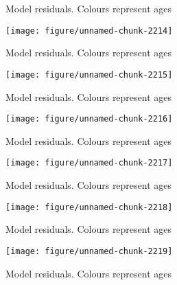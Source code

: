 \documentclass[a4paper]{article}\usepackage{graphicx, color}
\makeatletter
\def\maxwidth{ %
  \ifdim\Gin@nat@width>\linewidth
    \linewidth
  \else
    \Gin@nat@width
  \fi
}
\newenvironment{knitrout}{}{} %
\makeatother
\begin{document}
\begin{knitrout}
\begin{figure}[H]
\caption[Model residuals]{Model residuals. Colours represent ages\label{fig:unnamed-chunk-2213}}
\end{figure}
\begin{figure}[H]


{\centering \texttt{[image: figure/unnamed-chunk-2214]} 

}

\caption[Model residuals]{Model residuals. Colours represent ages\label{fig:unnamed-chunk-2214}}
\end{figure}
\begin{figure}[H]


{\centering \texttt{[image: figure/unnamed-chunk-2215]} 

}

\caption[Model residuals]{Model residuals. Colours represent ages\label{fig:unnamed-chunk-2215}}
\end{figure}
\begin{figure}[H]


{\centering \texttt{[image: figure/unnamed-chunk-2216]} 

}

\caption[Model residuals]{Model residuals. Colours represent ages\label{fig:unnamed-chunk-2216}}
\end{figure}
\begin{figure}[H]


{\centering \texttt{[image: figure/unnamed-chunk-2217]} 

}

\caption[Model residuals]{Model residuals. Colours represent ages\label{fig:unnamed-chunk-2217}}
\end{figure}
\begin{figure}[H]


{\centering \texttt{[image: figure/unnamed-chunk-2218]} 

}

\caption[Model residuals]{Model residuals. Colours represent ages\label{fig:unnamed-chunk-2218}}
\end{figure}
\begin{figure}[H]


{\centering \texttt{[image: figure/unnamed-chunk-2219]} 

}

\caption[Model residuals]{Model residuals. Colours represent ages\label{fig:unnamed-chunk-2219}}
\end{figure}
\begin{figure}[H]



\end{figure}
\end{knitrout}
\end{document}
